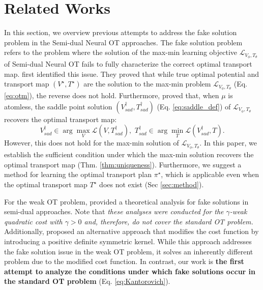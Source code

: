 \section{Related Works}
\label{sec:related_works}
In this section, we overview previous attempts to address the fake solution problem in the Semi-dual Neural OT approaches. The fake solution problem refers to the problem where the solution of the max-min learning objective $\mathcal{L}_{V_{\phi}, T_{\theta}}$ of Semi-dual Neural OT fails to fully characterize the correct optimal transport map. \citet{otm, fanscalable} first identified this issue. They proved that while true optimal potential and transport map $(V^{\star}, T^{\star})$ are the solution to the max-min problem $\mathcal{L}_{V_{\phi}, T_{\theta}}$ (Eq. \ref{eq:otm}), the reverse does not hold. Furthermore, \citet{fanTMLR} proved that, when $\mu$ is atomless, the saddle point solution $(V_{sad}^{\dagger}, T_{sad}^{\dagger})$ (Eq. \ref{eq:saddle_def}) of $\mathcal{L}_{V_{\phi}, T_{\theta}}$ recovers the optimal transport map:
\begin{equation} \label{eq:saddle_def}
        V_{sad}^{\dagger} \in \arg\max_{V} \mathcal{L} (V, T_{sad}^{\dagger}), \,\,
        T_{sad}^{\dagger} \in \arg\min_{T} \mathcal{L} (V_{sad}^{\dagger}, T).    
\end{equation} 
However, this does not hold for the max-min solution of $\mathcal{L}_{V_{\phi}, T_{\theta}}$. In this paper, we establish the sufficient condition under which the max-min solution recovers the optimal transport map (Thm. \ref{thm:uniqueness}). Furthermore, we suggest a method for learning the optimal transport plan $\pi^{\star}$, which is applicable even when the optimal transport map $T^{\star}$ does not exist (Sec \ref{sec:method}).

For the weak OT problem, \citet{not, knot} provided a theoretical analysis for fake solutions in semi-dual approaches. Note that \textit{these analyses were conducted for the $\gamma$-weak quadratic cost with $\gamma > 0$ and, therefore, do not cover the standard OT problem.} Additionally, \citet{knot} proposed an alternative approach that modifies the cost function by introducing a positive definite symmetric kernel. While this approach addresses the fake solution issue in the weak OT problem, it solves an inherently different problem due to the modified cost function. 
In contrast, our work is \textbf{the first attempt to analyze the conditions under which fake solutions occur in the standard OT problem} (Eq. \ref{eq:Kantorovich}).